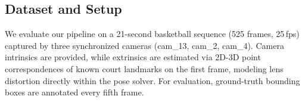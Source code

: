 \subsection{Dataset and Setup}
We evaluate our pipeline on a 21-second basketball sequence (525 frames, 25\,fps) captured by three synchronized cameras (cam\_13, cam\_2, cam\_4). 
Camera intrinsics are provided, while extrinsics are estimated via 2D-3D point correspondences of known court landmarks on the first frame, 
modeling lens distortion directly within the pose solver. 
For evaluation, ground-truth bounding boxes are annotated every fifth frame.